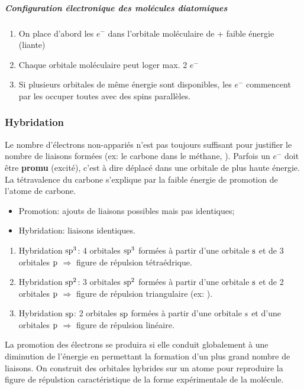 \subparagraph{Configuration électronique des molécules diatomiques}
\begin{enumerate}
  \item On place d'abord les $e^-$ dans l'orbitale moléculaire de + faible énergie (liante)
  \item Chaque orbitale moléculaire peut loger max. 2 $e^-$
  \item Si plusieurs orbitales de même énergie sont disponibles,
    les $e^-$ commencent par les occuper toutes avec des spins parallèles.
\end{enumerate}

\subsubsection{Hybridation}

Le nombre d'électrons non-appariés n'est pas toujours suffisant pour justifier le nombre de liaisons formées (ex: le carbone dans le méthane,
).
Parfois un $e^-$ doit être \textbf{promu} (excité),
c'est à dire déplacé dans une orbitale de plus haute énergie.
La tétravalence du carbone s'explique par la faible énergie de promotion de l'atome de carbone.
\begin{itemize}
  \item Promotion: ajouts de liaisons possibles mais pas identiques;
  \item Hybridation: liaisons identiques.
\end{itemize}
\begin{enumerate}
  \item Hybridation $\mathrm{s}\mathrm{p}^3$: 4 orbitales $\mathrm{s}\mathrm{p}^3$ formées à partir d'une orbitale $\mathrm{s}$ et de 3 orbitales $\mathrm{p}$ $\Rightarrow$ figure de répulsion tétraédrique.
  \item Hybridation $\mathrm{s}\mathrm{p}^2$: 3 orbitales $\mathrm{s}\mathrm{p}^2$ formées à partir d'une orbitale $\mathrm{s}$ et de 2 orbitales $\mathrm{p}$ $\Rightarrow$ figure de répulsion triangulaire (ex: ).
  \item Hybridation $\mathrm{s}\mathrm{p}$: 2 orbitales $\mathrm{s}\mathrm{p}$ formées à partir d'une orbitale $\mathrm{s}$ et d'une orbitales $\mathrm{p}$ $\Rightarrow$ figure de répulsion linéaire.
\end{enumerate}


La promotion des électrons se produira si elle conduit globalement à une diminution de l'énergie en permettant la formation d'un plus grand nombre de liaisons.
On construit des orbitales hybrides sur un atome pour reproduire la figure de répulstion caractéristique de la forme expérimentale de la molécule.

